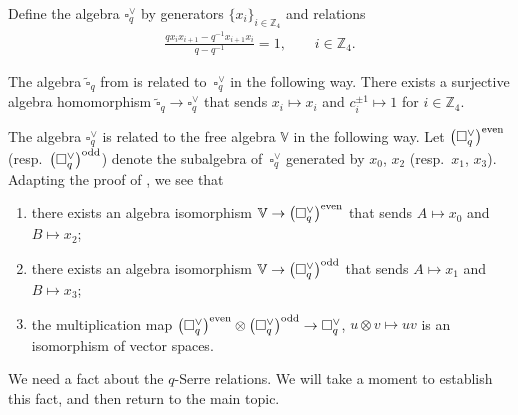 \begin{Definition}\label{def:squarecheck} Define the algebra $\square^{\vee}_q$ by generators $\lbrace x_i\rbrace_{i \in \mathbb Z_4}$ and relations
\begin{gather}
\frac{q x_i x_{i+1} - q^{-1} x_{i+1} x_i}{q-q^{-1}} = 1, \qquad i \in \mathbb Z_4.\label{eq:checkrels}
\end{gather}
\end{Definition}
\begin{Note}\label{note:square}
The algebra $\widetilde \square_q$ from \cite[Definition~6.1]{pospart} is related to~$\square^{\vee}_q$
in the following way. There exists a surjective algebra homomorphism $\widetilde \square_q \to \square^\vee_q$ that sends $x_i \mapsto x_i $ and $c^{\pm 1}_i \mapsto 1$ for $i \in \mathbb Z_4$.
\end{Note}

The algebra $\square^\vee_q$ is related to the free algebra $\mathbb V$ in the following way. Let $\big(\square^\vee_q\big)^{\rm even}$ (resp.\ $\big(\square^\vee_q\big)^{\rm odd}$) denote the subalgebra of~$\square^\vee_q$ generated by $x_0$, $x_2$ (resp.~$x_1$, $x_3$). Adapting the proof of
\cite[Proposition~6.17]{pospart}, we see that
 \begin{enumerate}\itemsep=0pt
\item[\rm (i)]
 there exists an algebra isomorphism
 $\mathbb V \to \big(\square^\vee_q\big)^{\rm even}$ that sends
 $A\mapsto x_0$ and
 $B\mapsto x_2$;
 \item[\rm (ii)]
 there exists an algebra isomorphism
 $\mathbb V \to \big(\square^\vee_q\big)^{\rm odd}$ that sends
 $A\mapsto x_1$ and
 $B\mapsto x_3$;
 \item[\rm (iii)]
 the multiplication map
 $\big(\square^\vee_q\big)^{\rm even}
 \otimes
 \big(\square^\vee_q\big)^{\rm odd}
 \to \square^\vee_q$,
 $u \otimes v \mapsto uv$ is an isomorphism of vector spaces.
\end{enumerate}

We need a fact about the $q$-Serre relations. We will take a moment to establish this fact, and then return
to the main topic.

